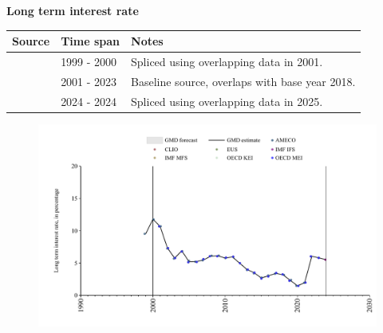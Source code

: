 \documentclass[12pt,a4paper,landscape]{article}
\begin{document}
\begin{adjustbox}{max totalsize={\paperwidth}{\paperheight},center}
\begin{minipage}[t][\textheight][t]{\textwidth}
\vspace*{0.5cm}
{}
\begin{center}
{\Large\bfseries Long term interest rate}
\end{center}
\vspace{0.5cm}
\begin{table}[H]
\centering
\small
\begin{tabular}{|l|l|l|}
\hline
\textbf{Source} & \textbf{Time span} & \textbf{Notes} \\
\hline
\rowcolor{white}\cite{AMECO}& 1999 - 2000 &Spliced using overlapping data in 2001. \\
\rowcolor{lightgray}\cite{OECD_MEI}& 2001 - 2023 &Baseline source, overlaps with base year 2018. \\
\rowcolor{white}\cite{EUS}& 2024 - 2024 &Spliced using overlapping data in 2025. \\
\hline
\end{tabular}
\end{table}
\begin{figure}[H]
\centering
\includegraphics[width=\textwidth,height=0.6\textheight,keepaspectratio]{graphs/POL_ltrate.pdf}
\end{figure}
\end{minipage}
\end{adjustbox}
\end{document}
